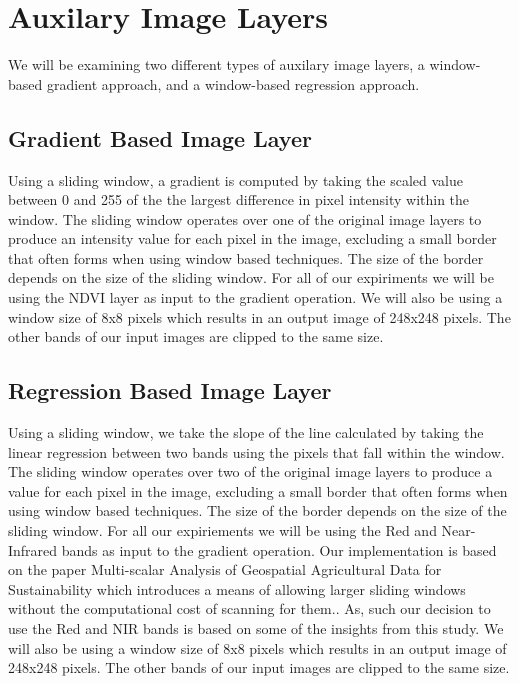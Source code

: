 \documentclass[12pt]{article}
\begin{document}
\section{Auxilary Image Layers}
We will be examining two different types of auxilary image layers, a window-based gradient approach, and a window-based regression approach.

\subsection{Gradient Based Image Layer}
Using a sliding window, a gradient is computed by taking the scaled value between 0 and 255 of the the largest difference in pixel intensity within the window. The sliding window operates over one of the original image layers to produce an intensity value for each pixel in the image, excluding a small border that often forms when using window based techniques. The size of the border depends on the size of the sliding window. For all of our expiriments we will be using the NDVI layer as input to the gradient operation. We will also be using a window size of 8x8 pixels which results in an output image of 248x248 pixels. The other bands of our input images are clipped to the same size.

\subsection{Regression Based Image Layer}
Using a sliding window, we take the slope of the line calculated by taking the linear regression between two bands using the pixels that fall within the window. The sliding window operates over two of the original image layers to produce a value for each pixel in the image, excluding a small border that often forms when using window based techniques. The size of the border depends on the size of the sliding window. For all our expiriements we will be using the Red and Near-Infrared bands as input to the gradient operation. Our implementation is based on the paper Multi-scalar Analysis of Geospatial Agricultural Data for Sustainability which introduces a means of allowing larger sliding windows without the computational cost of scanning for them.\cite{Denton}. As, such our decision to use the Red and NIR bands is based on some of the insights from this study. We will also be using a window size of 8x8 pixels which results in an output image of 248x248 pixels. The other bands of our input images are clipped to the same size.
\end{document}
